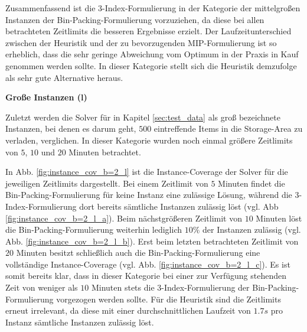 Zusammenfassend ist die 3-Index-Formulierung in der Kategorie der mittelgroßen Instanzen der Bin-Packing-Formulierung vorzuziehen, da diese bei allen betrachteten Zeitlimits die besseren Ergebnisse erzielt.
Der Laufzeitunterschied zwischen der Heuristik und der zu bevorzugenden MIP-Formulierung ist so erheblich,
dass die sehr geringe Abweichung vom Optimum in der Praxis in Kauf genommen werden sollte.
In dieser Kategorie stellt sich die Heuristik demzufolge als sehr gute Alternative heraus.

\textbf{Große Instanzen (l)}

Zuletzt werden die Solver für in Kapitel \ref{sec:test_data} als groß bezeichnete Instanzen, bei denen es darum geht,
$500$ eintreffende Items in die Storage-Area zu verladen, verglichen. In dieser Kategorie wurden noch einmal größere Zeitlimits von $5$, $10$ und $20$ Minuten betrachtet.

In Abb. \ref{fig:instance_cov_b=2_l} ist die Instance-Coverage der Solver für die jeweiligen Zeitlimits dargestellt.
Bei einem Zeitlimit von $5$ Minuten findet die Bin-Packing-Formulierung für keine Instanz eine zulässige Lösung,
während die 3-Index-Formulierung dort bereits sämtliche Instanzen zulässig löst (vgl. Abb \ref{fig:instance_cov_b=2_l_a}). Beim nächstgrößeren Zeitlimit von $10$ Minuten löst die Bin-Packing-Formulierung weiterhin lediglich $10 \%$ der Instanzen zulässig (vgl. Abb. \ref{fig:instance_cov_b=2_l_b}). Erst beim letzten betrachteten Zeitlimit von $20$ Minuten besitzt schließlich auch die Bin-Packing-Formulierung eine vollständige Instance-Coverage (vgl. Abb. \ref{fig:instance_cov_b=2_l_c}). Es ist somit bereits klar, dass in dieser Kategorie bei einer zur Verfügung stehenden Zeit von weniger als $10$ Minuten stets die 3-Index-Formulierung der Bin-Packing-Formulierung vorgezogen werden sollte. Für die Heuristik sind die Zeitlimits erneut irrelevant, da diese mit einer durchschnittlichen Laufzeit von $1.7s$ pro Instanz sämtliche Instanzen zulässig löst.

